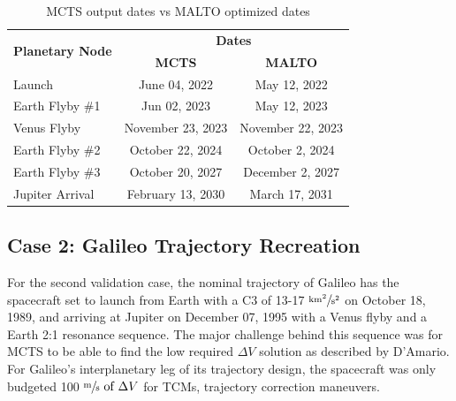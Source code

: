 \documentclass[letterpaper, preprint, paper,11pt]{AAS}	%
\begin{document}
\begin{table}[htb]
    \begin{center}
        \caption{MCTS output dates vs MALTO optimized dates}
        \label{table:clipMInputs}
        \begin{tabular}{lcc}
            \toprule
            \multirow{2}{*}{\textbf{Planetary Node}} & \multicolumn{2}{c}{\textbf{Dates}}\\
            \cmidrule{2-3}
            {} & \textbf{MCTS} & \textbf{MALTO}\\
            \midrule
            Launch & June 04, 2022 & May 12, 2022 \\
            Earth Flyby \#1 & Jun 02, 2023 & May 12, 2023 \\
            Venus Flyby & November 23, 2023 & November 22, 2023 \\ 
            Earth Flyby \#2 & October 22, 2024 & October 2, 2024 \\
            Earth Flyby \#3 & October 20, 2027 & December 2, 2027 \\
            Jupiter Arrival & February 13, 2030 & March 17, 2031 \\
            \bottomrule
        \end{tabular}
    \end{center}
\end{table}

\subsection{Case 2: Galileo Trajectory Recreation}

For the second validation case, the nominal trajectory of Galileo has the spacecraft set to launch from Earth with a C3 of 13-17 $\sfrac{\text{km}^2}{\text{s}^2}$ on October 18, 1989, and arriving at Jupiter on December 07, 1995 with a Venus flyby and a Earth 2:1 resonance sequence. The major challenge behind this sequence was for MCTS to be able to find the low required $\Delta V$ solution as described by D'Amario\cite{DAmario1992}. For Galileo's interplanetary leg of its trajectory design, the spacecraft was only budgeted 100 $\sfrac{\text{m}}{\text{s}} \text{ of } \Delta V$ for TCMs, trajectory correction maneuvers. 
\end{document}
